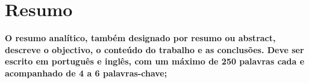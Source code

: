 \section*{Resumo}
{
\color{purple}\bf
O resumo analítico, também designado por resumo ou abstract, descreve o objectivo, o conteúdo do trabalho e as conclusões. Deve ser escrito em
português e inglês, com um máximo de 250 palavras cada e acompanhado de 4 a 6 palavras-chave;
}
\cleardoublepage